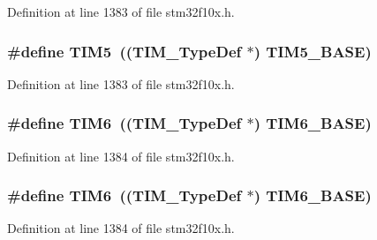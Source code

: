Definition at line 1383 of file stm32f10x.\+h.

\subsubsection[{\texorpdfstring{T\+I\+M5}{TIM5}}]{\setlength{\rightskip}{0pt plus 5cm}\#define T\+I\+M5~(({\bf T\+I\+M\+\_\+\+Type\+Def} $\ast$) {\bf T\+I\+M5\+\_\+\+B\+A\+SE})}\hypertarget{group___peripheral__declaration_ga5125ff6a23a2ed66e2e19bd196128c14}{}\label{group___peripheral__declaration_ga5125ff6a23a2ed66e2e19bd196128c14}


Definition at line 1383 of file stm32f10x.\+h.

\subsubsection[{\texorpdfstring{T\+I\+M6}{TIM6}}]{\setlength{\rightskip}{0pt plus 5cm}\#define T\+I\+M6~(({\bf T\+I\+M\+\_\+\+Type\+Def} $\ast$) {\bf T\+I\+M6\+\_\+\+B\+A\+SE})}\hypertarget{group___peripheral__declaration_gac7b4ed55f9201b498b38c962cca97314}{}\label{group___peripheral__declaration_gac7b4ed55f9201b498b38c962cca97314}


Definition at line 1384 of file stm32f10x.\+h.

\subsubsection[{\texorpdfstring{T\+I\+M6}{TIM6}}]{\setlength{\rightskip}{0pt plus 5cm}\#define T\+I\+M6~(({\bf T\+I\+M\+\_\+\+Type\+Def} $\ast$) {\bf T\+I\+M6\+\_\+\+B\+A\+SE})}\hypertarget{group___peripheral__declaration_gac7b4ed55f9201b498b38c962cca97314}{}\label{group___peripheral__declaration_gac7b4ed55f9201b498b38c962cca97314}


Definition at line 1384 of file stm32f10x.\+h.

